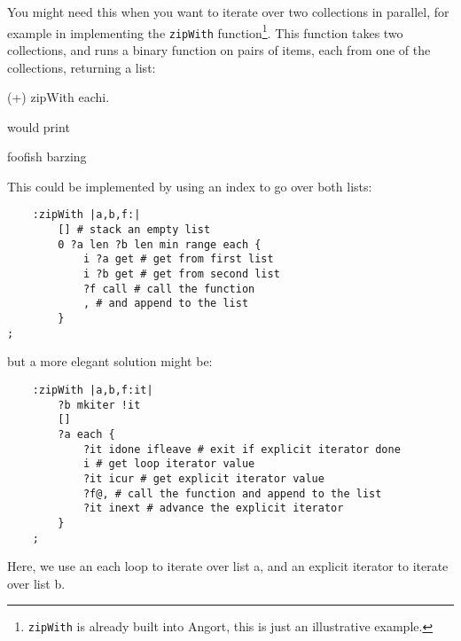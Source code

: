 You might need this when you want to iterate over
two collections in parallel, for example in implementing the \texttt{zipWith}
function\footnote{\texttt{zipWith} is already built into Angort,
this is just an illustrative example.}. This function takes two collections, and runs a binary function on
pairs of items, each from one of the collections, returning a list:

\begin{v}
     (+) zipWith each{i.}
\end{v}
\noindent would print
\begin{v}
    foofish
    barzing
\end{v}
This could be implemented by using an index to go over both lists:

\begin{lstlisting}
    :zipWith |a,b,f:|
        [] # stack an empty list
        0 ?a len ?b len min range each {
            i ?a get # get from first list
            i ?b get # get from second list
            ?f call # call the function
            , # and append to the list
        }
;
\end{lstlisting}
but a more elegant solution might be:
\begin{lstlisting}
    :zipWith |a,b,f:it|
        ?b mkiter !it
        []
        ?a each {
            ?it idone ifleave # exit if explicit iterator done
            i # get loop iterator value
            ?it icur # get explicit iterator value
            ?f@, # call the function and append to the list
            ?it inext # advance the explicit iterator
        }
    ;
\end{lstlisting}
Here, we use an each loop to iterate over list a, and an explicit
iterator to iterate over list b.

